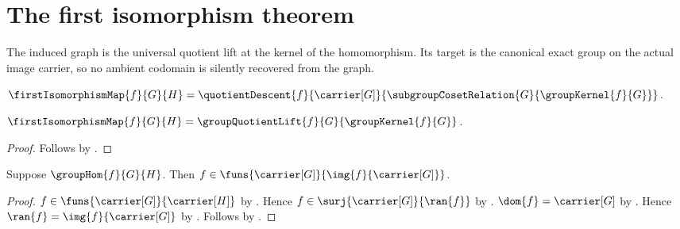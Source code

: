 


\section{The first isomorphism theorem}

The induced graph is the universal quotient lift at the kernel of the
homomorphism.  Its target is the canonical exact group on the actual image
carrier, so no ambient codomain is silently recovered from the graph.

\begin{definition}\label{first_isomorphism_map}
    $\firstIsomorphismMap{f}{G}{H}=
        \quotientDescent
            {f}{\carrier[G]}
            {\subgroupCosetRelation{G}{\groupKernel{f}{G}}}$.
\end{definition}

\begin{proposition}\label{first_isomorphism_map_eq_group_quotient_lift}
    $\firstIsomorphismMap{f}{G}{H}=
        \groupQuotientLift{f}{G}{\groupKernel{f}{G}}$.
\end{proposition}
\begin{proof}
    Follows by
        .
\end{proof}

\begin{proposition}\label{group_hom_image_type}
    Suppose $\groupHom{f}{G}{H}$.
    Then $f\in
        \funs{\carrier[G]}{\img{f}{\carrier[G]}}$.
\end{proposition}
\begin{proof}
    $f\in\funs{\carrier[G]}{\carrier[H]}$ by
        .
    Hence $f\in\surj{\carrier[G]}{\ran{f}}$ by
        .
    $\dom{f}=\carrier[G]$ by .
    Hence $\ran{f}=\img{f}{\carrier[G]}$ by .
    Follows by .
\end{proof}

